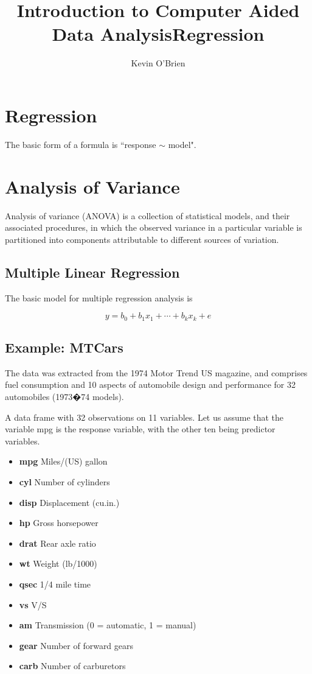 \documentclass[12pt, a4paper]{report}
\title{Introduction to Computer Aided Data Analysis}
\author{ } \date{ }
\theoremstyle{plain}
\theoremstyle{definition}
\theoremstyle{remark}
\begin{document}
\author{Kevin O'Brien}
\title{Regression}




\section{Regression}
The basic form of a formula is ``response $\sim$ model".

\section{Analysis of Variance}
Analysis of variance (ANOVA) is a collection of statistical models, and their associated procedures, in which the observed variance in a particular variable is partitioned into components attributable to different sources of variation.



\subsection{Multiple Linear Regression}
The basic model for multiple regression analysis is

\[
y = b_0 + b_1x_1 + \cdots  + b_kx_k + e
\]


\subsection{Example: MTCars}
The data was extracted from the 1974 Motor Trend US magazine, and comprises fuel consumption and 10 aspects of automobile design and performance for 32 automobiles (1973�74 models).

A data frame with 32 observations on 11 variables. Let
us assume that the variable mpg is the response variable, with the other ten being predictor variables.

\begin{itemize}
\item  \textbf{mpg}  Miles/(US) gallon
\item  \textbf{cyl}  Number of cylinders
\item  \textbf{disp}  Displacement (cu.in.)
\item  \textbf{hp}  Gross horsepower
\item  \textbf{drat}  Rear axle ratio
\item  \textbf{wt}  Weight (lb/1000)
\item  \textbf{qsec}  1/4 mile time
\item  \textbf{vs}  V/S
\item  \textbf{am}  Transmission (0 = automatic, 1 = manual)
\item  \textbf{gear}  Number of forward gears
\item  \textbf{carb}  Number of carburetors
\end{itemize}
\end{document}

